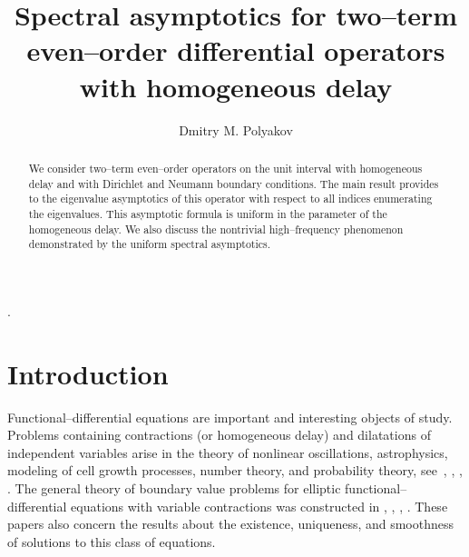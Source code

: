 \documentclass[11pt,centertags,reqno,twoside]{amsart}
\numberwithin{equation}{section}
\theoremstyle{definition}
\theoremstyle{remark}
\begin{document}
\title[Spectral asymptotics for two--term even--order differential operators with
homogeneous delay]
{Spectral asymptotics for two--term even--order differential operators with
homogeneous delay}

\author[D. M. Polyakov]
{Dmitry M. Polyakov}

\address{Dmitry M. Polyakov\newline\hspace*{9mm} Southern Mathematical Institute, Vladikavkaz Scientific Center of
RAS\newline\hspace*{9mm}
Vladikavkaz, 53 Vatutin str., Russia\newline\hspace*{9mm}
Bashkir State Pedagogical University named after M. Akhmulla\newline\hspace*{9mm}
Ufa, 3a Oktyabrskoj rev. str., Russia}

.

\begin{abstract}
We consider two--term even--order operators on the unit interval with
homogeneous delay and with Dirichlet and Neumann boundary conditions. The main result
provides to the eigenvalue asymptotics of this operator with respect to all indices
enumerating the eigenvalues. This asymptotic formula is uniform in the parameter
of the homogeneous delay. We also discuss the nontrivial
high--frequency phenomenon demonstrated by the uniform spectral asymptotics.
\end{abstract}

\maketitle

\section{Introduction}\label{sec1}

Functional--differential equations are important and interesting objects of study.
Problems containing contractions (or homogeneous delay) and dilatations of
independent variables arise in the theory of nonlinear oscillations, astrophysics,
modeling of cell growth processes, number theory, and probability theory,
see~\cite{Ambartsumyan}, \cite{Ockendon}, \cite{Hall}, \cite{Gaver}.
The general theory of boundary value
problems for elliptic functional--differential equations with variable contractions
was constructed in \cite{Ros2011}, \cite{Ros2017}, \cite{RosTovs2019}, \cite{RosTovs2022}.
These papers also concern the results about the existence, uniqueness, and
smoothness of solutions to this class of equations.
\end{document}

